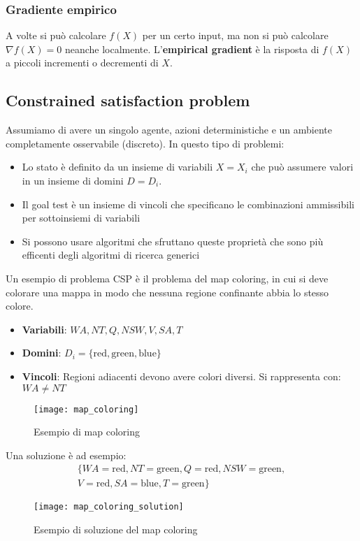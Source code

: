 \documentclass[a4paper]{article}
\begin{document}
\subsubsection{Gradiente empirico}
A volte si può calcolare \( f(X) \) per un certo input, ma non si può calcolare
\( \nabla f(X) = 0 \) neanche localmente. L'\textbf{empirical gradient} è la risposta
di \( f(X) \) a piccoli incrementi o decrementi di \( X \).

\subsection{Constrained satisfaction problem}
Assumiamo di avere un singolo agente, azioni deterministiche e un ambiente completamente
osservabile (discreto). In questo tipo di problemi:
\begin{itemize}
  \item Lo stato è definito da un insieme di variabili \( X = X_i \) che può assumere
    valori in un insieme di domini \( D = D_i \).
  \item Il goal test è un insieme di vincoli che specificano le combinazioni ammissibili
    per sottoinsiemi di variabili
  \item Si possono usare algoritmi che sfruttano queste proprietà che sono più efficenti
    degli algoritmi di ricerca generici
\end{itemize}

\begin{example}
  Un esempio di problema CSP è il problema del map coloring, in cui si deve colorare
  una mappa in modo che nessuna regione confinante abbia lo stesso colore.
  \begin{itemize}
    \item \textbf{Variabili}: \( WA, NT, Q, NSW, V, SA, T \) 
    \item \textbf{Domini}: \( D_i = \{\text{red}, \text{green}, \text{blue}\}  \) 
    \item \textbf{Vincoli}: Regioni adiacenti devono avere colori diversi. Si rappresenta
      con: \( WA \neq NT \)
  \end{itemize}
  \begin{figure}[H]
    \centering
    \texttt{[image: map\_coloring]}
    \caption{Esempio di map coloring}
  \end{figure}
  \noindent
  Una soluzione è ad esempio:
  \[
    \begin{aligned}
      \{ WA = \text{red}, NT = \text{green}, Q = \text{red}, NSW = \text{green},\\
      V = \text{red}, SA = \text{blue}, T = \text{green} \}
    \end{aligned}
  \] 
  \begin{figure}[H]
    \centering
    \texttt{[image: map\_coloring\_solution]}
    \caption{Esempio di soluzione del map coloring}
  \end{figure}
\end{example}
\end{document}
